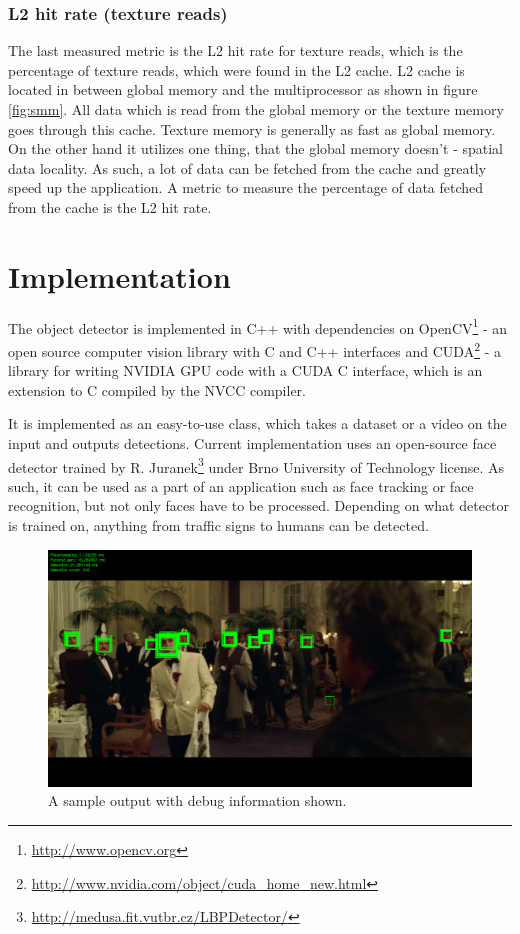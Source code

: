 \subsection{L2 hit rate (texture reads)} \label{subsec:metrics-l2-hit-rate-texture}

The last measured metric is the L2 hit rate for texture reads, which is the percentage of texture reads, which were found in the L2 cache. L2 cache is located in between global memory and the multiprocessor as shown in figure \ref{fig:smm}. All data which is read from the global memory or the texture memory goes through this cache. Texture memory is generally as fast as global memory. On the other hand it utilizes one thing, that the global memory doesn't - spatial data locality. As such, a lot of data can be fetched from the cache and greatly speed up the application. A metric to measure the percentage of data fetched from the cache is the L2 hit rate.

\chapter{Implementation}\label{ch:implementation}

The object detector is implemented in C++ with dependencies on OpenCV\footnote{\url{http://www.opencv.org}} - an open source computer vision library with C and C++ interfaces and CUDA\footnote{\url{http://www.nvidia.com/object/cuda_home_new.html}} - a library for writing NVIDIA GPU code with a CUDA C interface, which is an extension to C compiled by the NVCC compiler.

It is implemented as an easy-to-use class, which takes a dataset or a video on the input and outputs detections. Current implementation uses an open-source face detector trained by R. Juranek\footnote{\url{http://medusa.fit.vutbr.cz/LBPDetector/}} under Brno University of Technology license. As such, it can be used as a part of an application such as face tracking or face recognition, but not only faces have to be processed. Depending on what detector is trained on, anything from traffic signs to humans can be detected.

\begin{center}
\begin{figure}[h]
	\centering\includegraphics[width=\textwidth]{fig/sample.jpg}
	\caption{A sample output with debug information shown.}
	\label{fig:sample}
\end{figure}
\end{center}

